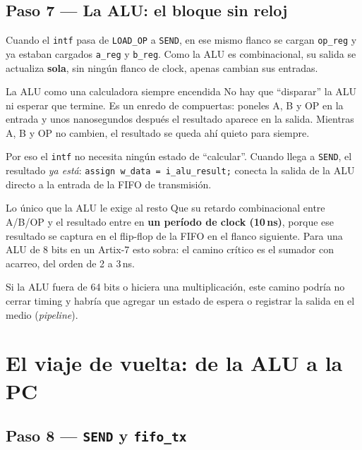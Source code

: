 \documentclass[11pt,a4paper]{article}
\newcommand{\sg}[1]{\texttt{\small #1}}
\begin{document}
\subsection{Paso 7 --- La ALU: el bloque sin reloj}

Cuando el \sg{intf} pasa de \sg{LOAD\_OP} a \sg{SEND}, en ese mismo flanco se
cargan \sg{op\_reg} y ya estaban cargados \sg{a\_reg} y \sg{b\_reg}. Como la ALU
es combinacional, su salida se actualiza \textbf{sola}, sin ning\'un flanco de
clock, apenas cambian sus entradas.

\begin{intuicion}{La ALU como una calculadora siempre encendida}
No hay que ``disparar'' la ALU ni esperar que termine. Es un enredo de compuertas:
poneles A, B y OP en la entrada y unos nanosegundos despu\'es el resultado aparece
en la salida. Mientras A, B y OP no cambien, el resultado se queda ah\'i quieto
para siempre.

\smallskip
Por eso el \sg{intf} no necesita ning\'un estado de ``calcular''. Cuando llega a
\sg{SEND}, el resultado \emph{ya est\'a}: \sg{assign w\_data = i\_alu\_result;}
conecta la salida de la ALU directo a la entrada de la FIFO de transmisi\'on.
\end{intuicion}

\begin{ojo}{Lo \'unico que la ALU le exige al resto}
Que su retardo combinacional entre A/B/OP y el resultado entre en \textbf{un
per\'iodo de clock (10\,ns)}, porque ese resultado se captura en el flip-flop de
la FIFO en el flanco siguiente. Para una ALU de 8 bits en un Artix-7 esto sobra:
el camino cr\'itico es el sumador con acarreo, del orden de 2 a 3\,ns.

\smallskip
Si la ALU fuera de 64 bits o hiciera una multiplicaci\'on, este camino podr\'ia
no cerrar timing y habr\'ia que agregar un estado de espera o registrar la salida
en el medio (\emph{pipeline}).
\end{ojo}

\section{El viaje de vuelta: de la ALU a la PC}

\subsection{Paso 8 --- \texttt{SEND} y \texttt{fifo\_tx}}
\end{document}
